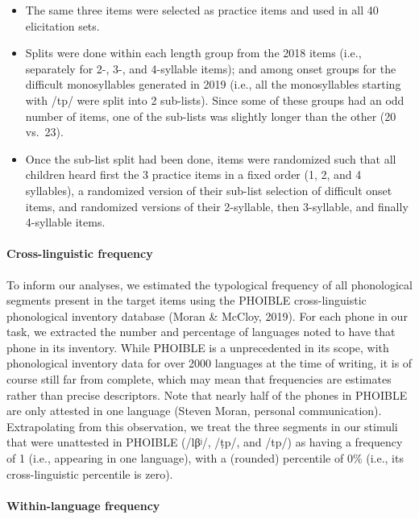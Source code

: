 \documentclass[
  english,
  ,man,floatsintext]{apa6}
\providecommand{\tightlist}{%
  \setlength{\itemsep}{0pt}\setlength{\parskip}{0pt}}
\let\oldparagraph\paragraph
\renewcommand{\paragraph}[1]{\oldparagraph{#1}\mbox{}}
\begin{document}
\begin{itemize}
\tightlist
\item
  The same three items were selected as practice items and used in all 40 elicitation sets.
\item
  Splits were done within each length group from the 2018 items (i.e., separately for 2-, 3-, and 4-syllable items); and among onset groups for the difficult monosyllables generated in 2019 (i.e., all the monosyllables starting with /tp/ were split into 2 sub-lists). Since some of these groups had an odd number of items, one of the sub-lists was slightly longer than the other (20 vs.~23).
\item
  Once the sub-list split had been done, items were randomized such that all children heard first the 3 practice items in a fixed order (1, 2, and 4 syllables), a randomized version of their sub-list selection of difficult onset items, and randomized versions of their 2-syllable, then 3-syllable, and finally 4-syllable items.
\end{itemize}

\hypertarget{cross-linguistic-frequency}{%
\paragraph{Cross-linguistic frequency}\label{cross-linguistic-frequency}}

To inform our analyses, we estimated the typological frequency of all phonological segments present in the target items using the PHOIBLE cross-linguistic phonological inventory database (Moran \& McCloy, 2019). For each phone in our task, we extracted the number and percentage of languages noted to have that phone in its inventory. While PHOIBLE is a unprecedented in its scope, with phonological inventory data for over 2000 languages at the time of writing, it is of course still far from complete, which may mean that frequencies are estimates rather than precise descriptors. Note that nearly half of the phones in PHOIBLE are only attested in one language (Steven Moran, personal communication). Extrapolating from this observation, we treat the three segments in our stimuli that were unattested in PHOIBLE (/lβʲ/, /ṭp/, and /tp/) as having a frequency of 1 (i.e., appearing in one language), with a (rounded) percentile of 0\% (i.e., its cross-linguistic percentile is zero).

\hypertarget{within-language-frequency}{%
\paragraph{Within-language frequency}\label{within-language-frequency}}
\end{document}
